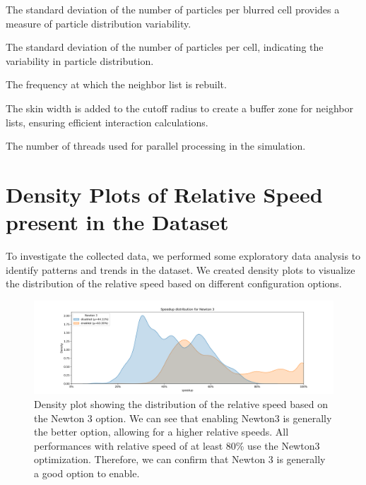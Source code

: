 \begin{description}[style=multiline, leftmargin =40mm]
  \item [particlesPerBlurredCellStdDev] The standard deviation of the number of particles per blurred cell provides a measure of particle distribution variability.
  \item [particlesPerCellStdDev] The standard deviation of the number of particles per cell, indicating the variability in particle distribution.
  \item [rebuildFrequency] The frequency at which the neighbor list is rebuilt.
  \item [skin] The skin width is added to the cutoff radius to create a buffer zone for neighbor lists, ensuring efficient interaction calculations.
  \item [threadCount] The number of threads used for parallel processing in the simulation.
\end{description}



\section{Density Plots of Relative Speed present in the Dataset}

To investigate the collected data, we performed some exploratory data analysis to identify patterns and trends in the dataset. We created density plots to visualize the distribution of the relative speed based on different configuration options.

\begin{figure}[H]
  \centering
  \includegraphics[width=\columnwidth,trim={1cm 0 2cm 1.5cm},clip]{figures/DataAnalytics/speedup_Newton 3.png}
  \caption[Speedup density plot based on the Newton 3 option]{Density plot showing the distribution of the relative speed based on the Newton 3 option. We can see that enabling Newton3 is generally the better option, allowing for a higher relative speeds. All performances with relative speed of at least 80\% use the Newton3 optimization. Therefore, we can confirm that Newton 3 is generally a good option to enable.}
  \label{fig:inputAnalysisDensityNewton3}
\end{figure}

